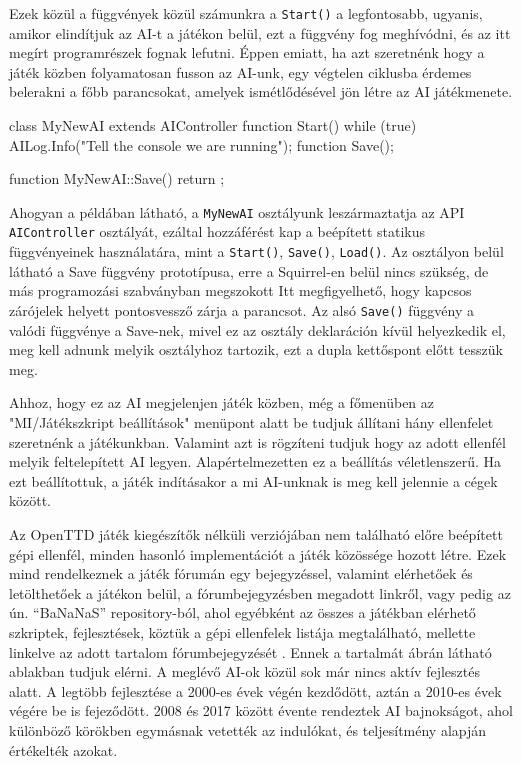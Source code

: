 Ezek közül a függvények közül számunkra a \texttt{Start()} a legfontosabb, ugyanis, amikor elindítjuk az AI-t a játékon belül, ezt a függvény fog meghívódni, és az itt megírt programrészek fognak lefutni. Éppen emiatt, ha azt szeretnénk hogy a játék közben folyamatosan fusson az AI-unk, egy végtelen ciklusba érdemes belerakni a főbb parancsokat, amelyek ismétlődésével jön létre az AI játékmenete.

\begin{cpp}
class MyNewAI extends AIController
{
  function Start()
  {
    while (true) {
      AILog.Info("Tell the console we are running");
  }
}
  function Save();
}

function MyNewAI::Save()
{
  return {};
}
\end{cpp}

Ahogyan a példában látható, a \texttt{MyNewAI} osztályunk leszármaztatja az API \\ \texttt{AIController} osztályát, ezáltal hozzáférést kap a beépített statikus függvényeinek használatára, mint a \texttt{Start()}, \texttt{Save()}, \texttt{Load()}. Az osztályon belül látható a Save függvény prototípusa, erre a Squirrel-en belül nincs szükség, de más programozási szabványban megszokott Itt megfigyelhető, hogy kapcsos zárójelek helyett pontosvessző zárja a parancsot. Az alsó \texttt{Save()} függvény a valódi függvénye a Save-nek, mivel ez az osztály deklaráción kívül helyezkedik el, meg kell adnunk melyik osztályhoz tartozik, ezt a dupla kettőspont előtt tesszük meg.

Ahhoz, hogy ez az AI megjelenjen játék közben, még a főmenüben az "MI/Játékszkript beállítások" menüpont alatt be tudjuk állítani hány ellenfelet szeretnénk a játékunkban. Valamint azt is rögzíteni tudjuk hogy az adott ellenfél melyik feltelepített AI legyen. Alapértelmezetten ez a beállítás véletlenszerű. Ha ezt beállítottuk, a játék indításakor a mi AI-unknak is meg kell jelennie a cégek között.


Az OpenTTD játék kiegészítők nélküli verziójában nem található előre beépített gépi ellenfél, minden hasonló implementációt a játék közössége hozott létre. Ezek mind rendelkeznek a játék fórumán egy bejegyzéssel, valamint elérhetőek és letölthetőek a játékon belül, a fórumbejegyzésben megadott linkről, vagy pedig az ún. “BaNaNaS” repository-ból, ahol egyébként az összes a játékban elérhető szkriptek, fejlesztések, köztük a gépi ellenfelek listája megtalálható, mellette linkelve az adott tartalom fórumbejegyzését \cite{openttdbananas}. Ennek a tartalmát  ábrán látható ablakban tudjuk elérni. A meglévő AI-ok közül sok már nincs aktív fejlesztés alatt. A legtöbb fejlesztése a 2000-es évek végén kezdődött, aztán a 2010-es évek végére be is fejeződött. 2008 és 2017 között évente rendeztek AI bajnokságot, ahol különböző körökben egymásnak vetették az indulókat, és teljesítmény alapján értékelték azokat.

